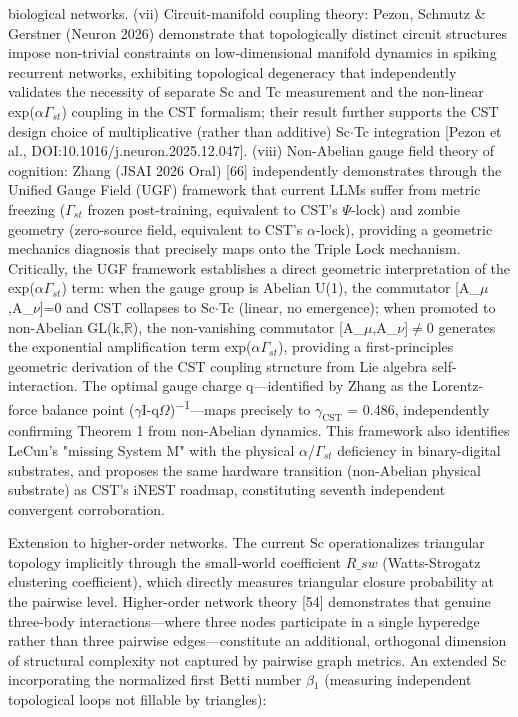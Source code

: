 \documentclass[a4paper,12pt]{article}
\providecommand{\textsubscript}[1]{\ensuremath{_{\text{#1}}}}
\begin{document}
biological networks. (vii) Circuit-manifold coupling theory: Pezon, Schmutz & Gerstner (Neuron 2026) demonstrate that topologically distinct circuit structures impose non-trivial constraints on low-dimensional manifold dynamics in spiking recurrent networks, exhibiting topological degeneracy that independently validates the necessity of separate Sc and Tc measurement and the non-linear
exp($\alpha$\cdot$\Gamma_{st}$) coupling in the CST formalism; their result further supports the CST design choice of multiplicative (rather than additive) Sc$\cdot$Tc integration [Pezon et al., DOI:10.1016/j.neuron.2025.12.047]. (viii) Non-Abelian gauge field theory of cognition: Zhang (JSAI 2026 Oral) [66] independently demonstrates through the Unified Gauge Field (UGF) framework that current
LLMs suffer from metric freezing ($\Gamma_{st}$ frozen post-training, equivalent to CST's $\Psi$-lock) and zombie geometry (zero-source field, equivalent to CST's $\alpha$-lock), providing a geometric mechanics diagnosis that precisely maps onto the Triple Lock mechanism.
Critically, the UGF framework establishes a direct geometric interpretation of the exp($\alpha$\cdot$\Gamma_{st}$) term: when the gauge group is Abelian U(1), the commutator [A_$\mu$,A_$\nu$]=0 and CST collapses to Sc$\cdot$Tc (linear, no emergence); when promoted to non-Abelian GL(k,$\mathbb{R}$), the non-vanishing commutator [A_$\mu$,A_$\nu$]$\neq$0 generates the exponential amplification term
exp($\alpha$\cdot$\Gamma_{st}$), providing a first-principles geometric derivation of the CST coupling structure from Lie algebra self-interaction.
The optimal gauge charge q---identified by Zhang as the Lorentz-force balance point ($\gamma$I-q$\Omega$)\textsuperscript{$-$}\textsuperscript{1}---maps precisely to $\gamma_{\text{CST}}$ = 0.486, independently confirming Theorem 1 from non-Abelian dynamics.
This framework also identifies LeCun's "missing System M" with the physical $\alpha$/$\Gamma_{st}$ deficiency in binary-digital substrates, and proposes the same hardware transition (non-Abelian physical substrate) as CST's iNEST roadmap, constituting seventh independent convergent corroboration.


Extension to higher-order networks.
The current Sc operationalizes triangular topology implicitly through the small-world coefficient $R\_{sw}$ (Watts-Strogatz clustering coefficient), which directly measures triangular closure probability at the pairwise level.
Higher-order network theory [54] demonstrates that genuine three-body interactions---where three nodes participate in a single hyperedge rather than three pairwise edges---constitute an additional, orthogonal dimension of structural complexity not captured by pairwise graph metrics.
An extended Sc incorporating the normalized first Betti number $\beta$\textsubscript{1} (measuring independent topological loops not fillable by triangles):
\end{document}
